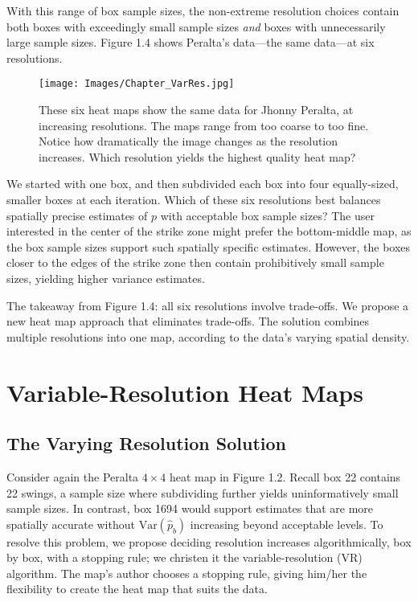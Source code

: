 With this range of box sample sizes, the non-extreme resolution choices contain both boxes with exceedingly small sample sizes {\it and} boxes with unnecessarily large sample sizes. Figure 1.4 shows Peralta's data---the same data---at six resolutions. 
        \begin{figure}[H]
      	\centering
      	\texttt{[image: Images/Chapter\_VarRes.jpg]} 
      	\caption{These six heat maps show the same data for Jhonny Peralta, at increasing resolutions. The maps range from too coarse to too fine. Notice how dramatically the image changes as the resolution increases. Which resolution yields the highest quality heat map?}
      	\end{figure} 
We started with one box, and then subdivided each box into four equally-sized, smaller boxes at each iteration. Which of these six resolutions best balances spatially precise estimates of $p$ with acceptable box sample sizes? The user interested in the center of the strike zone might prefer the bottom-middle map, as the box sample sizes support such spatially specific estimates. However, the boxes closer to the edges of the strike zone then contain prohibitively small sample sizes, yielding higher variance estimates. 

The takeaway from Figure 1.4: all six resolutions involve trade-offs. We propose a new heat map approach that eliminates trade-offs. The solution combines multiple resolutions into one map, according to the data's varying spatial density.

\section{Variable-Resolution Heat Maps} 

\subsection{The Varying Resolution Solution}

Consider again the Peralta $4 \times 4$ heat map in Figure 1.2. Recall box 22 contains 22 swings, a sample size where subdividing further yields uninformatively small sample sizes. In contrast, box 1694 would support estimates that are more spatially accurate without $\text{Var}(\hat{p}_{b})$ increasing beyond acceptable levels. To resolve this problem, we propose deciding resolution increases algorithmically, box by box, with a stopping rule; we christen it the variable-resolution (VR) algorithm. The map's author chooses a stopping rule, giving him/her the flexibility to create the heat map that suits the data. 


